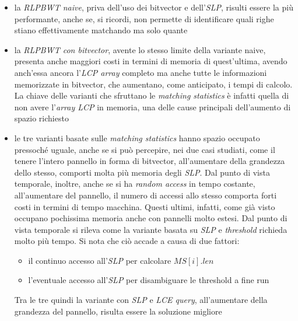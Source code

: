 \begin{itemize}
  \item la \textit{RLPBWT naive}, priva dell'uso dei bitvector e
  dell'\textit{SLP}, risulti essere la più performante, anche se, si ricordi,
  non permette di identificare quali righe stiano effettivamente matchando ma
  solo quante
  \item la \textit{RLPBWT con bitvector}, avente lo stesso limite della variante
  naive, presenta anche maggiori costi in termini di memoria di quest'ultima,
  avendo anch'essa ancora l'\textit{LCP array} completo ma anche tutte le
  informazioni memorizzate in bitvector, che aumentano, come anticipato, i tempi
  di calcolo. La chiave delle varianti che sfruttano
  le \textit{matching statistics} è infatti quella di non avere l'\textit{array
    LCP} in memoria, una delle cause principali dell'aumento di spazio richiesto
  \item le tre varianti basate sulle \textit{matching statistics} hanno spazio
  occupato pressoché uguale, anche se si può percepire, nei due casi studiati,
  come il tenere l'intero pannello in forma di bitvector, all'aumentare della
  grandezza dello stesso, comporti molta più memoria degli \textit{SLP}. Dal
  punto di vista temporale, inoltre, anche se si ha \textit{random access} in
  tempo costante, all'aumentare del pannello, il numero di accessi allo stesso
  comporta forti costi in termini di tempo macchina. Questi
  ultimi, infatti, come già visto occupano pochissima memoria anche con pannelli
  molto estesi. Dal punto di vista temporale si rileva come la variante basata
  su \textit{SLP} e \textit{threshold} richieda molto più tempo. Si nota che ciò
  accade a causa di due fattori:
  \begin{itemize}
    \item il continuo accesso all'\textit{SLP} per calcolare $MS[i].len$
    \item l'eventuale accesso all'\textit{SLP} per disambiguare le threshold a
    fine run
  \end{itemize}
  Tra le tre quindi la variante con \textit{SLP} e \textit{LCE query},
  all'aumentare della grandezza del pannello, risulta essere la soluzione
  migliore
\end{itemize}

